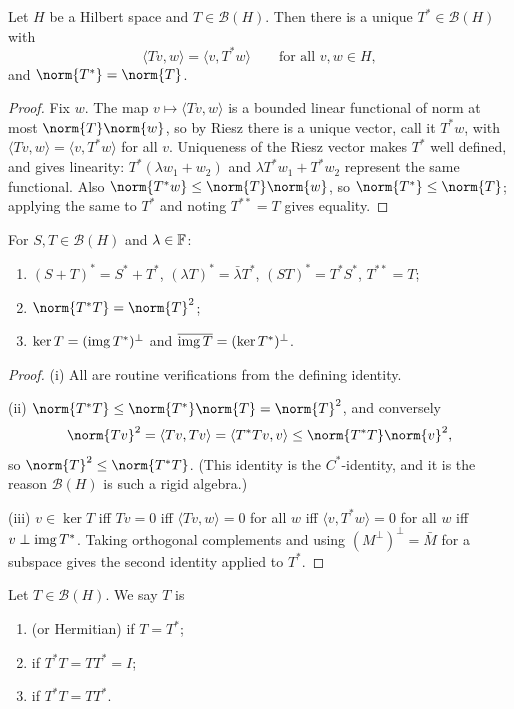 \documentclass[a4paper]{scrartcl}
\newcommand{\ip}[2]{\langle #1, #2 \rangle}
\newcommand{\Bop}{\mathcal{B}}
\begin{document}
\begin{proposition}
	Let $H$ be a Hilbert space and $T \in \Bop(H)$. Then there is a unique $T^* \in \Bop(H)$ with
	$$\ip{Tv}{w} = \ip{v}{T^*w} \qquad \text{for all } v,w \in H,$$
	and $\norm{T^*}=\norm{T}$.
\end{proposition}

\begin{proof}
	Fix $w$. The map $v \mapsto \ip{Tv}{w}$ is a bounded linear functional of norm at most $\norm{T}\norm{w}$, so by Riesz there is a unique vector, call it $T^*w$, with $\ip{Tv}{w}=\ip{v}{T^*w}$ for all $v$. Uniqueness of the Riesz vector makes $T^*$ well defined, and gives linearity: $T^*(\lambda w_1+w_2)$ and $\lambda T^*w_1 + T^*w_2$ represent the same functional. Also $\norm{T^*w}\leq\norm{T}\norm{w}$, so $\norm{T^*}\leq\norm{T}$; applying the same to $T^*$ and noting $T^{**}=T$ gives equality.
\end{proof}

\begin{proposition}
	For $S,T\in\Bop(H)$ and $\lambda \in \mathbb{F}$:
	\begin{enumerate}[label=(\roman*)]
		\item $(S+T)^*=S^*+T^*$, $(\lambda T)^* = \bar\lambda T^*$, $(ST)^*=T^*S^*$, $T^{**}=T$;
		\item $\norm{T^*T} = \norm{T}^2$;
		\item $\ker T = (\operatorname{img} T^*)^\perp$ and $\overline{\operatorname{img} T} = (\ker T^*)^\perp$.
	\end{enumerate}
\end{proposition}

\begin{proof}
	(i) All are routine verifications from the defining identity.

	(ii) $\norm{T^*T}\leq\norm{T^*}\norm{T}=\norm{T}^2$, and conversely
	$$\norm{Tv}^2 = \ip{Tv}{Tv} = \ip{T^*Tv}{v}\leq\norm{T^*T}\norm{v}^2,$$
	so $\norm{T}^2\leq\norm{T^*T}$. (This identity is the $C^*$-identity, and it is the reason $\Bop(H)$ is such a rigid algebra.)

	(iii) $v \in \ker T$ iff $Tv = 0$ iff $\ip{Tv}{w}=0$ for all $w$ iff $\ip{v}{T^*w}=0$ for all $w$ iff $v \perp \operatorname{img} T^*$. Taking orthogonal complements and using $(M^\perp)^\perp = \bar M$ for a subspace gives the second identity applied to $T^*$.
\end{proof}

\begin{definition}
	Let $T \in \Bop(H)$. We say $T$ is
	\begin{enumerate}[label=(\roman*)]
		\item {} (or Hermitian) if $T = T^*$;
		\item {} if $T^*T = TT^* = I$;
		\item {} if $T^*T = TT^*$.
	\end{enumerate}
\end{definition}
\end{document}
